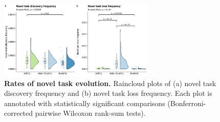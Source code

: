 \begin{figure}[ht!]
    \centering
    \includegraphics[width=0.66\textwidth]{chapters/03-evolutionary-consequences-of-plasticity/media/complex-traits-pace-panel.pdf}
    \caption{\small
    \textbf{Rates of novel task evolution.}
    Raincloud plots of 
    (a) novel task discovery frequency
    and (b) novel task loss frequency.
    Each plot is annotated with statistically significant comparisons (Bonferroni-corrected pairwise Wilcoxon rank-sum tests).
    }
    \label{chapter:consequences-of-plasticity:fig:complex-traits-rate}
\end{figure}